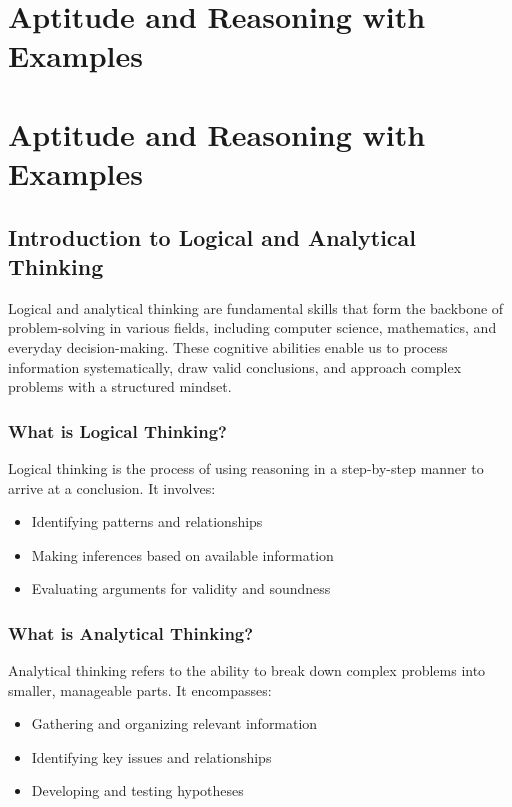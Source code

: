 \section{Aptitude and Reasoning with Examples}

\section{Aptitude and Reasoning with Examples}

\subsection{Introduction to Logical and Analytical Thinking}

Logical and analytical thinking are fundamental skills that form the
backbone of problem-solving in various fields, including computer
science, mathematics, and everyday decision-making. These cognitive
abilities enable us to process information systematically, draw valid
conclusions, and approach complex problems with a structured mindset.

\subsubsection{What is Logical Thinking?}

Logical thinking is the process of using reasoning in a step-by-step
manner to arrive at a conclusion. It involves:

\begin{itemize}
    \item Identifying patterns and relationships
    \item Making inferences based on available information
    \item Evaluating arguments for validity and soundness
\end{itemize}

\subsubsection{What is Analytical Thinking?}

Analytical thinking refers to the ability to break down complex problems
into smaller, manageable parts. It encompasses:

\begin{itemize}
    \item Gathering and organizing relevant information
    \item Identifying key issues and relationships
    \item Developing and testing hypotheses
\end{itemize}


